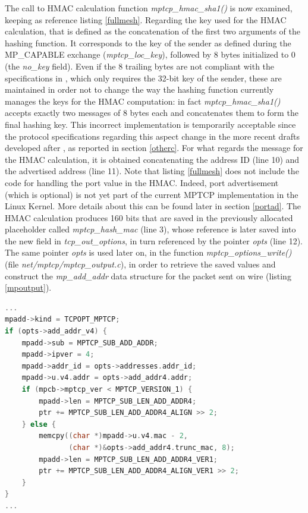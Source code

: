 The call to HMAC calculation function \textit{mptcp\_hmac\_sha1()} is now examined, keeping as reference listing \ref{fullmesh}. Regarding the key used for the HMAC calculation, that is defined as the concatenation of the first two arguments of the hashing function. It corresponds to the key of the sender as defined during the MP\_CAPABLE exchange (\textit{mptcp\_loc\_key}), followed by 8 bytes initialized to 0 (the \textit{no\_key} field). Even if the 8 trailing bytes are not compliant with the specifications in , which only requires the 32-bit key of the sender, these are maintained in order not to change the way the hashing function currently manages the keys for the HMAC computation: in fact \textit{mptcp\_hmac\_sha1()} accepts exactly two messages of 8 bytes each and concatenates them to form the final hashing key. This incorrect implementation is temporarily acceptable since the protocol specifications regarding this aspect change in the more recent drafts developed after , as reported in section \ref{otherc}.
For what regards the message for the HMAC calculation, it is obtained concatenating the address ID (line 10) and the advertised address (line 11). Note that listing \ref{fullmesh} does not include the code for handling the port value in the HMAC. Indeed, port advertisement (which is optional) is not yet part of the current MPTCP implementation in the Linux Kernel. More details about this can be found later in section \ref{portad}. 
The HMAC calculation produces 160 bits that are saved in the previously allocated placeholder called \textit{mptcp\_hash\_mac} (line 3), whose reference is later saved into the new field in \textit{tcp\_out\_options}, in turn referenced by the pointer \textit{opts} (line 12). The same pointer \textit{opts} is used later on, in the function \textit{mptcp\_options\_write()} (file \textit{net/mptcp/mptcp\_output.c}), in order to retrieve the saved values and construct the \textit{mp\_add\_addr} data structure for the packet sent on wire (listing \ref{mpoutput}).

\begin{lstlisting}[language=c, caption=Building ADD\_ADDR2 outgoing message, label=mpoutput]
...
mpadd->kind = TCPOPT_MPTCP;
if (opts->add_addr_v4) {
	mpadd->sub = MPTCP_SUB_ADD_ADDR;
	mpadd->ipver = 4;
	mpadd->addr_id = opts->addresses.addr_id;
	mpadd->u.v4.addr = opts->add_addr4.addr;
	if (mpcb->mptcp_ver < MPTCP_VERSION_1) {
		mpadd->len = MPTCP_SUB_LEN_ADD_ADDR4;
		ptr += MPTCP_SUB_LEN_ADD_ADDR4_ALIGN >> 2;
	} else {
		memcpy((char *)mpadd->u.v4.mac - 2,
	           (char *)&opts->add_addr4.trunc_mac, 8);
		mpadd->len = MPTCP_SUB_LEN_ADD_ADDR4_VER1;
		ptr += MPTCP_SUB_LEN_ADD_ADDR4_ALIGN_VER1 >> 2;
	}
}
...
\end{lstlisting}

